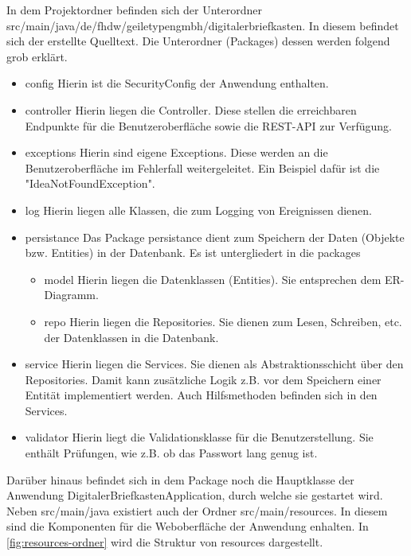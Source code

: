 In dem Projektordner befinden sich der Unterordner src/main/java/de/fhdw/geiletypengmbh/digitalerbriefkasten. In diesem
befindet sich der erstellte Quelltext. Die Unterordner (Packages) dessen werden folgend grob erklärt.
\begin{itemize}
    \item config
    \subitem Hierin ist die SecurityConfig der Anwendung enthalten.
    \item controller
    \subitem Hierin liegen die Controller. Diese stellen die erreichbaren Endpunkte für die Benutzeroberfläche sowie die REST-API zur Verfügung.
    \item exceptions
    \subitem Hierin sind eigene Exceptions. Diese werden an die Benutzeroberfläche im Fehlerfall weitergeleitet. Ein Beispiel dafür ist die "IdeaNotFoundException".
    \item log
    \subitem Hierin liegen alle Klassen, die zum Logging von Ereignissen dienen.
    \item persistance
    \subitem Das Package persistance dient zum Speichern der Daten (Objekte bzw. Entities) in der Datenbank. Es ist untergliedert
    in die packages
    \begin{itemize}
        \item model
        \subitem Hierin liegen die Datenklassen (Entities). Sie entsprechen dem ER-Diagramm.
        \item repo
        \subitem Hierin liegen die Repositories. Sie dienen zum Lesen, Schreiben, etc. der Datenklassen in die Datenbank.
    \end{itemize}
    \item service
    \subitem Hierin liegen die Services. Sie dienen als Abstraktionsschicht über den Repositories. Damit kann zusätzliche Logik z.B. vor dem Speichern einer Entität implementiert werden. Auch Hilfsmethoden befinden sich in den Services.
    \item validator
    \subitem Hierin liegt die Validationsklasse für die Benutzerstellung. Sie enthält Prüfungen, wie z.B. ob das Passwort lang genug ist.
\end{itemize}
Darüber hinaus befindet sich in dem Package noch die Hauptklasse der Anwendung DigitalerBriefkastenApplication, durch welche sie gestartet wird.
\newline
Neben src/main/java existiert auch der Ordner src/main/resources. In diesem sind die Komponenten für die Weboberfläche der Anwendung enhalten.
In \cref{fig:resources-ordner} wird die Struktur von resources dargestellt.

